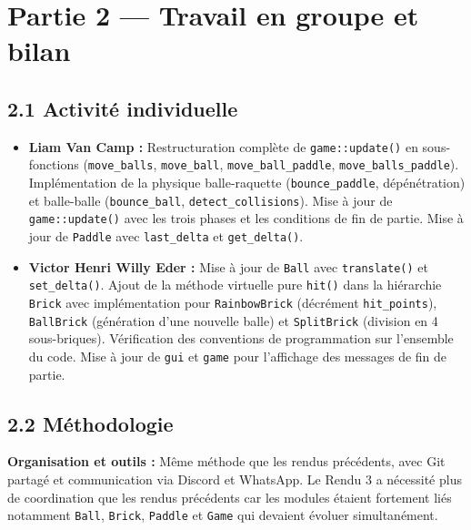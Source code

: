 \documentclass[10pt,a4paper]{article}
\begin{document}
\section*{Partie 2 — Travail en groupe et bilan}

\subsection*{2.1 Activité individuelle}

\begin{itemize}[noitemsep, topsep=2pt]
    \item \textbf{Liam Van Camp :} Restructuration complète de \texttt{game::update()} en
      sous-fonctions (\texttt{move\_balls}, \texttt{move\_ball}, \texttt{move\_ball\_paddle},
      \texttt{move\_balls\_paddle}). Implémentation de la physique balle-raquette
      (\texttt{bounce\_paddle}, dépénétration) et balle-balle (\texttt{bounce\_ball},
      \texttt{detect\_collisions}). Mise à jour de \texttt{game::update()} avec les trois
      phases et les conditions de fin de partie. Mise à jour de \texttt{Paddle} avec
      \texttt{last\_delta} et \texttt{get\_delta()}.
    \item \textbf{Victor Henri Willy Eder :} Mise à jour de \texttt{Ball} avec
      \texttt{translate()} et \texttt{set\_delta()}. Ajout de la méthode virtuelle pure
      \texttt{hit()} dans la hiérarchie \texttt{Brick} avec implémentation pour
      \texttt{RainbowBrick} (décrément \texttt{hit\_points}), \texttt{BallBrick} (génération
      d'une nouvelle balle) et \texttt{SplitBrick} (division en 4 sous-briques). Vérification
      des conventions de programmation sur l'ensemble du code. Mise à jour de \texttt{gui} et
      \texttt{game} pour l'affichage des messages de fin de partie.
\end{itemize}

\subsection*{2.2 Méthodologie}

\textbf{Organisation et outils :}
Même méthode que les rendus précédents, avec Git partagé et communication via Discord et
WhatsApp. Le Rendu 3 a nécessité plus de coordination que les rendus précédents car les
modules étaient fortement liés notamment \texttt{Ball}, \texttt{Brick}, \texttt{Paddle}
et \texttt{Game} qui devaient évoluer simultanément.
\end{document}

